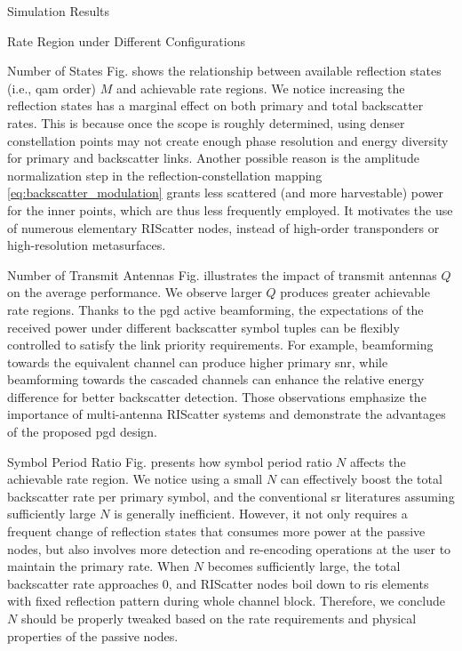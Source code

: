 \documentclass[journal]{IEEEtran}
\begin{document}
\begin{section}{Simulation Results}
\begin{subsection}{Rate Region under Different Configurations}
		\begin{subsubsection}{Number of States}
			Fig.  shows the relationship between available reflection states (i.e., \gls{qam} order) $M$ and achievable rate regions.
			We notice increasing the reflection states has a marginal effect on both primary and total backscatter rates.
			This is because once the scope is roughly determined, using denser constellation points may not create enough phase resolution and energy diversity for primary and backscatter links.
			Another possible reason is the amplitude normalization step in the reflection-constellation mapping \eqref{eq:backscatter_modulation} grants less scattered (and more harvestable) power for the inner points, which are thus less frequently employed.
			It motivates the use of numerous elementary RIScatter nodes, instead of high-order transponders or high-resolution metasurfaces.
		\end{subsubsection}

		\begin{subsubsection}{Number of Transmit Antennas}
			Fig.  illustrates the impact of transmit antennas $Q$ on the average performance.
			We observe larger $Q$ produces greater achievable rate regions.
			Thanks to the \gls{pgd} active beamforming, the expectations of the received power under different backscatter symbol tuples can be flexibly controlled to satisfy the link priority requirements.
			For example, beamforming towards the equivalent channel can produce higher primary \gls{snr}, while beamforming towards the cascaded channels can enhance the relative energy difference for better backscatter detection.
			Those observations emphasize the importance of multi-antenna RIScatter systems and demonstrate the advantages of the proposed \gls{pgd} design.
		\end{subsubsection}

		\begin{subsubsection}{Symbol Period Ratio}
			Fig.  presents how symbol period ratio $N$ affects the achievable rate region.
			We notice using a small $N$ can effectively boost the total backscatter rate per primary symbol, and the conventional \gls{sr} literatures assuming sufficiently large $N$ is generally inefficient.
			However, it not only requires a frequent change of reflection states that consumes more power at the passive nodes, but also involves more detection and re-encoding operations at the user to maintain the primary rate.
			When $N$ becomes sufficiently large, the total backscatter rate approaches \num{0}, and RIScatter nodes boil down to \gls{ris} elements with fixed reflection pattern during whole channel block.
			Therefore, we conclude $N$ should be properly tweaked based on the rate requirements and physical properties of the passive nodes.
		\end{subsubsection}


\end{subsection}
\end{section}
\end{document}
